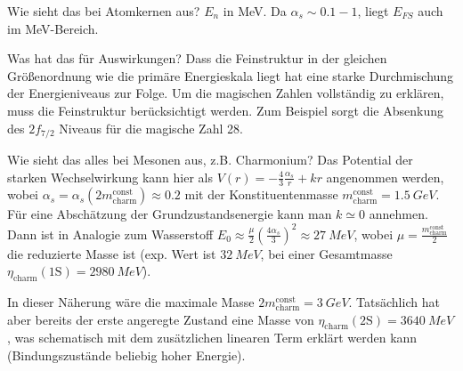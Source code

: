 \begin{fquestion}{Wie sieht das bei Atomkernen aus?}
    $E_n$ in MeV.
    Da $\alpha_s \sim 0.1-1$, liegt $E_{FS}$ auch im MeV-Bereich.
\end{fquestion}

\begin{fquestion}{Was hat das für Auswirkungen?}
    Dass die Feinstruktur in der gleichen Größenordnung wie die primäre Energieskala liegt hat eine starke Durchmischung der Energieniveaus zur Folge. 
    Um die magischen Zahlen vollständig zu erklären, muss die Feinstruktur berücksichtigt werden. 
    Zum Beispiel sorgt die Absenkung des $2f_{7/2}$ Niveaus für die magische Zahl 28. 
\end{fquestion}


    

\begin{fquestion}{Wie sieht das alles bei Mesonen aus, z.B. Charmonium?}
    Das Potential der starken Wechselwirkung kann hier als $V(r) = -\frac{4}{3} \frac{\alpha_s}{r} + kr$ angenommen werden, wobei $\alpha_s = \alpha_s(2m_\mathrm{charm}^\mathrm{const}) \approx 0.2$ mit der Konstituentenmasse $m_\mathrm{charm}^\mathrm{const} = \SI{1.5}{GeV}$.
    Für eine Abschätzung der Grundzustandsenergie kann man $k\simeq 0$ annehmen.
    Dann ist in Analogie zum Wasserstoff $E_0\approx \frac{\mu }{2}\left(\frac{4\alpha_s}{3} \right)^2 \approx \SI{27}{MeV} $, wobei $\mu = \frac{m_\mathrm{charm}^\mathrm{const}}{2}$ die reduzierte Masse ist (exp. Wert ist $\SI{32}{MeV}$, bei einer Gesamtmasse $\eta_\mathrm{charm}(1\mathrm{S} ) = \SI{2980}{MeV}$).
    
    In dieser Näherung wäre die maximale Masse $2m_\mathrm{charm}^\mathrm{const} = \SI{3}{GeV}$.
    Tatsächlich hat aber bereits der erste angeregte Zustand eine Masse von $\eta_\mathrm{charm}(2\mathrm{S} ) = \SI{3640}{MeV}$, was schematisch mit dem zusätzlichen linearen Term erklärt werden kann (Bindungszustände beliebig hoher Energie).
    
\end{fquestion}

